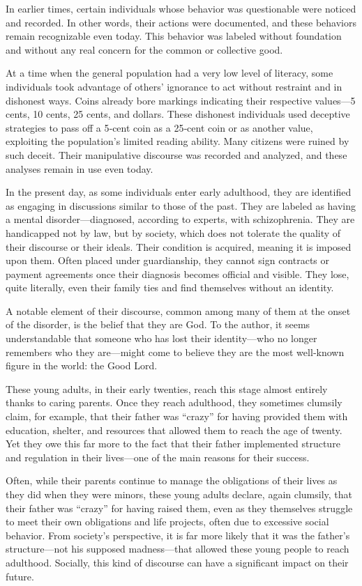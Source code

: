 \documentclass[12pt,oneside]{article}
\begin{document}
In earlier times, certain individuals whose behavior was questionable were noticed and recorded. In other words, their actions were documented, and these behaviors remain recognizable even today. This behavior was labeled without foundation and without any real concern for the common or collective good.

At a time when the general population had a very low level of literacy, some individuals took advantage of others’ ignorance to act without restraint and in dishonest ways. Coins already bore markings indicating their respective values—5 cents, 10 cents, 25 cents, and dollars. These dishonest individuals used deceptive strategies to pass off a 5‑cent coin as a 25‑cent coin or as another value, exploiting the population’s limited reading ability. Many citizens were ruined by such deceit. Their manipulative discourse was recorded and analyzed, and these analyses remain in use even today.

In the present day, as some individuals enter early adulthood, they are identified as engaging in discussions similar to those of the past. They are labeled as having a mental disorder—diagnosed, according to experts, with schizophrenia. They are handicapped not by law, but by society, which does not tolerate the quality of their discourse or their ideals. Their condition is acquired, meaning it is imposed upon them. Often placed under guardianship, they cannot sign contracts or payment agreements once their diagnosis becomes official and visible. They lose, quite literally, even their family ties and find themselves without an identity.

A notable element of their discourse, common among many of them at the onset of the disorder, is the belief that they are God. To the author, it seems understandable that someone who has lost their identity—who no longer remembers who they are—might come to believe they are the most well‑known figure in the world: the Good Lord.

These young adults, in their early twenties, reach this stage almost entirely thanks to caring parents. Once they reach adulthood, they sometimes clumsily claim, for example, that their father was “crazy” for having provided them with education, shelter, and resources that allowed them to reach the age of twenty. Yet they owe this far more to the fact that their father implemented structure and regulation in their lives—one of the main reasons for their success.

Often, while their parents continue to manage the obligations of their lives as they did when they were minors, these young adults declare, again clumsily, that their father was “crazy” for having raised them, even as they themselves struggle to meet their own obligations and life projects, often due to excessive social behavior. From society’s perspective, it is far more likely that it was the father’s structure—not his supposed madness—that allowed these young people to reach adulthood. Socially, this kind of discourse can have a significant impact on their future.
\end{document}
